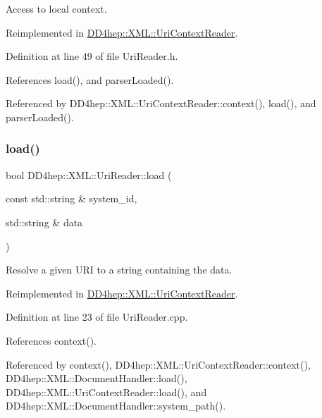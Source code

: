 Access to local context. 



Reimplemented in \hyperlink{class_d_d4hep_1_1_x_m_l_1_1_uri_context_reader_ad7ba7d778fdc8df96cca1e298003a403}{D\+D4hep\+::\+X\+M\+L\+::\+Uri\+Context\+Reader}.



Definition at line 49 of file Uri\+Reader.\+h.



References load(), and parser\+Loaded().



Referenced by D\+D4hep\+::\+X\+M\+L\+::\+Uri\+Context\+Reader\+::context(), load(), and parser\+Loaded().

\hypertarget{class_d_d4hep_1_1_x_m_l_1_1_uri_reader_a4cb644360608b580a1aaa4ccb9a8c7fa}{}\label{class_d_d4hep_1_1_x_m_l_1_1_uri_reader_a4cb644360608b580a1aaa4ccb9a8c7fa} 
\subsubsection{\texorpdfstring{load()}{load()}\hspace{0.1cm}{\footnotesize\ttfamily [1/2]}}
{\footnotesize\ttfamily bool D\+D4hep\+::\+X\+M\+L\+::\+Uri\+Reader\+::load (\begin{DoxyParamCaption}\item[{const std\+::string \&}]{system\+\_\+id,  }\item[{std\+::string \&}]{data }\end{DoxyParamCaption})\hspace{0.3cm}{\ttfamily [virtual]}}



Resolve a given U\+RI to a string containing the data. 



Reimplemented in \hyperlink{class_d_d4hep_1_1_x_m_l_1_1_uri_context_reader_a1a6ca7eb85dadbc69463a367f396fe72}{D\+D4hep\+::\+X\+M\+L\+::\+Uri\+Context\+Reader}.



Definition at line 23 of file Uri\+Reader.\+cpp.



References context().



Referenced by context(), D\+D4hep\+::\+X\+M\+L\+::\+Uri\+Context\+Reader\+::context(), D\+D4hep\+::\+X\+M\+L\+::\+Document\+Handler\+::load(), D\+D4hep\+::\+X\+M\+L\+::\+Uri\+Context\+Reader\+::load(), and D\+D4hep\+::\+X\+M\+L\+::\+Document\+Handler\+::system\+\_\+path().

